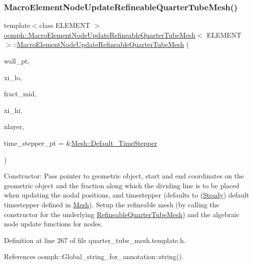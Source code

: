 \subsubsection{\texorpdfstring{Macro\+Element\+Node\+Update\+Refineable\+Quarter\+Tube\+Mesh()}{MacroElementNodeUpdateRefineableQuarterTubeMesh()}}
{\footnotesize\ttfamily template$<$class E\+L\+E\+M\+E\+NT $>$ \\
\hyperlink{classoomph_1_1MacroElementNodeUpdateRefineableQuarterTubeMesh}{oomph\+::\+Macro\+Element\+Node\+Update\+Refineable\+Quarter\+Tube\+Mesh}$<$ E\+L\+E\+M\+E\+NT $>$\+::\hyperlink{classoomph_1_1MacroElementNodeUpdateRefineableQuarterTubeMesh}{Macro\+Element\+Node\+Update\+Refineable\+Quarter\+Tube\+Mesh} (\begin{DoxyParamCaption}\item[{\hyperlink{classoomph_1_1GeomObject}{Geom\+Object} $\ast$}]{wall\+\_\+pt,  }\item[{const \hyperlink{classoomph_1_1Vector}{Vector}$<$ double $>$ \&}]{xi\+\_\+lo,  }\item[{const double \&}]{fract\+\_\+mid,  }\item[{const \hyperlink{classoomph_1_1Vector}{Vector}$<$ double $>$ \&}]{xi\+\_\+hi,  }\item[{const unsigned \&}]{nlayer,  }\item[{\hyperlink{classoomph_1_1TimeStepper}{Time\+Stepper} $\ast$}]{time\+\_\+stepper\+\_\+pt = {\ttfamily \&\hyperlink{classoomph_1_1Mesh_a12243d0fee2b1fcee729ee5a4777ea10}{Mesh\+::\+Default\+\_\+\+Time\+Stepper}} }\end{DoxyParamCaption})\hspace{0.3cm}{\ttfamily [inline]}}



Constructor\+: Pass pointer to geometric object, start and end coordinates on the geometric object and the fraction along which the dividing line is to be placed when updating the nodal positions, and timestepper (defaults to (\hyperlink{classoomph_1_1Steady}{Steady}) default timestepper defined in \hyperlink{classoomph_1_1Mesh}{Mesh}). Setup the refineable mesh (by calling the constructor for the underlying \hyperlink{classoomph_1_1RefineableQuarterTubeMesh}{Refineable\+Quarter\+Tube\+Mesh}) and the algebraic node update functions for nodes. 



Definition at line 267 of file quarter\+\_\+tube\+\_\+mesh.\+template.\+h.



References oomph\+::\+Global\+\_\+string\+\_\+for\+\_\+annotation\+::string().

